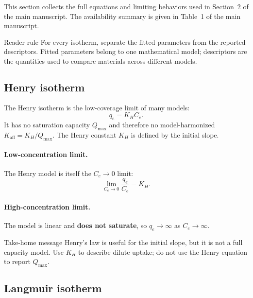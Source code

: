 \documentclass[journal=jacsat,manuscript=article]{achemso}
\begin{document}
This section collects the full equations and limiting behaviors used in
Section~2 of the main manuscript. The availability summary is given in
Table~1 of the main manuscript.

\begin{bluebox}{Reader rule}
	For every isotherm, separate the fitted parameters from the reported
	descriptors. Fitted parameters belong to one mathematical model;
	descriptors are the quantities used to compare materials across
	different models.
\end{bluebox}

\subsection{Henry isotherm}
\label{sec:si_henry}

The Henry isotherm is the low-coverage limit of many models:
\begin{equation}
	q_e = K_H C_e.
	\label{eq:si_henry_model}
\end{equation}
It has no saturation capacity $Q_{\max}$ and therefore no
model-harmonized $K_{\mathrm{aff}} = K_H/Q_{\max}$. The Henry constant
$K_H$ is defined by the initial slope.

\paragraph{Low-concentration limit.}
The Henry model is itself the $C_e \to 0$ limit:
\begin{equation}
	\lim_{C_e \to 0} \frac{q_e}{C_e} = K_H.
\end{equation}

\paragraph{High-concentration limit.}
The model is linear and \textbf{does not saturate}, so $q_e \to \infty$ as
$C_e \to \infty$.

\begin{greenbox}{Take-home message}
	Henry's law is useful for the initial slope, but it is not a full
	capacity model. Use \(K_H\) to describe dilute uptake; do not use the
	Henry equation to report \(Q_{\max}\).
\end{greenbox}

\subsection{Langmuir isotherm}
\label{sec:si_langmuir}
\end{document}
